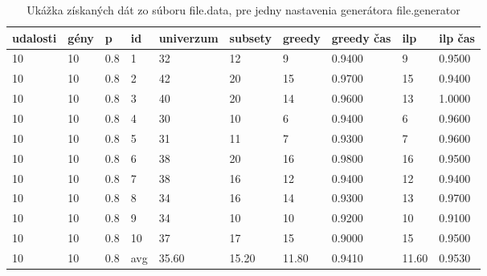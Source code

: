 \begin{table}[t]

\begin{center}
\begin{tabular}{llllllllll}
udalosti&gény&p&id&univerzum&subsety&greedy&greedy čas&ilp&ilp čas\\
\hline
10&10&0.8&1&32&12&9&0.9400&9&0.9500\\
10&10&0.8&2&42&20&15&0.9700&15&0.9400\\
10&10&0.8&3&40&20&14&0.9600&13&1.0000\\
10&10&0.8&4&30&10&6&0.9400&6&0.9600\\
10&10&0.8&5&31&11&7&0.9300&7&0.9600\\
10&10&0.8&6&38&20&16&0.9800&16&0.9500\\
10&10&0.8&7&38&16&12&0.9400&12&0.9400\\
10&10&0.8&8&34&16&14&0.9300&13&0.9700\\
10&10&0.8&9&34&10&10&0.9200&10&0.9100\\
10&10&0.8&10&37&17&15&0.9000&15&0.9500\\
10&10&0.8&avg&35.60&15.20&11.80&0.9410&11.60&0.9530\\
\end{tabular}
\end{center}
\caption{Ukážka získaných dát zo súboru file.data, pre jedny nastavenia generátora file.generator}\label{tab:vyslednedata}
\end{table}

